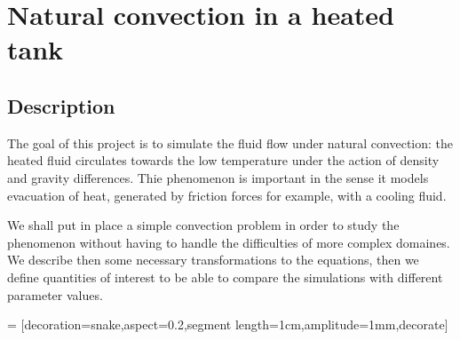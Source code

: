 \newcommand{\Gr}{\ensuremath{\mathrm{Gr}\xspace}}
\renewcommand{\Pr}{\ensuremath{\mathrm{Pr}\xspace}}

\section{Natural convection in a heated tank}


\subsection{Description}
\label{sec:description}

The goal of this project is to simulate the fluid flow under natural
convection: the heated fluid circulates towards the low temperature
under the action of density and gravity differences. Thie phenomenon
is important in the sense it models evacuation of heat, generated by
friction forces for example, with  a cooling fluid.

We shall put in place a simple convection problem in order to study
the phenomenon without having to handle the difficulties of more
complex domaines. We describe then some necessary transformations to
the equations, then we define quantities of interest to be able to
compare the simulations with different parameter values.


\newcommand{\Water}{\text{\textsc{Water}}\xspace}
\newcommand{\Fluid}{\text{\textsc{Fluid}}\xspace}
 = [decoration={snake,aspect=0.2,segment length=1cm,amplitude=1mm},decorate]

